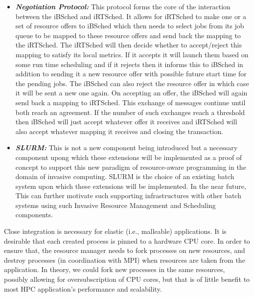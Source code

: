 \begin{itemize}
\item \textbf{\textit{Negotiation Protocol:}} This protocol forms the core of the interaction between the iBSched and iRTSched. It allows for iRTSched to make one or a set of resource offers to iBSched which then needs to select jobs from its job queue to be mapped to these resource offers and send back the mapping to the iRTSched. The iRTSched will then decide whether to accept/reject this mapping to satisfy its local metrics. If it accepts it will launch them based on some run time scheduling and if it rejects then it informs this to iBSched in addition to sending it a new resource offer with possible future start time for the pending jobs. The iBSched can also reject the resource offer in which case it will be sent a new one again. On accepting an offer, the iBSched will again send back a mapping to iRTSched. This exchange of messages continue until both reach an agreement. If the number of such exchanges reach a threshold then iBSched will just accept whatever offer it receives and iRTSched will also accept whatever mapping it receives and closing the transaction. 
\item \textbf{\textit{SLURM:}} This is not a new component being introduced but a necessary component upong which these extensions will be implemented as a proof of concept to support this new paradigm of resource-aware programming in the domain of invasive computing. SLURM is the choice of an existing batch system upon which these extensions will be implemented. In the near future, This can further motivate such supporting infrastructures with other batch systems using such Invasive Resource Management and Scheduling components.
\end{itemize}
\noindent
Close integration is necessary for elastic (i.e., malleable) applications. It is desirable that each created process is pinned to a hardware CPU core. In order to ensure that, the resource manager needs to fork processes on new resources, and destroy processes (in coordination with MPI) when resources are taken from the application. In theory, we could fork new processes in the same resources, possibly allowing for oversubscription of CPU cores, but that is of little benefit to most HPC application's performance and scalability. 

